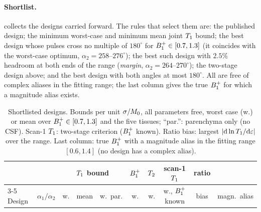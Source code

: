 \paragraph{Shortlist.}  collects the designs carried forward. The rules that
select them are: the published design; the minimum worst-case and minimum mean joint $T_1$
bound; the best design whose pulses cross no multiple of $180^\circ$ for $B_1^{+}\in[0.7,1.3]$ (it coincides
with the worst-case optimum, $\alpha_2=258$--$276^\circ$); the best such design with $2.5\%$ headroom at both ends
of the range (\emph{margin}, $\alpha_2=264$--$270^\circ$); the two-stage design above; and the best design with
both angles at most $180^\circ$. All are free of complex aliases in the fitting range; the last column
gives the true $B_1^{+}$ for which a magnitude alias exists.

\begin{table}[!htbp]
\centering
\caption{Shortlisted designs. Bounds per unit $\sigma/M_0$, all parameters free, worst case (w.) or
mean over $B_1^{+}\in[0.7,1.3]$ and the five tissues; ``par.'': parenchyma only (no CSF). Scan-1 $T_1$:
two-stage criterion ($B_1^{+}$ known). Ratio bias: largest $|\mathrm d\ln T_1/\mathrm d\varepsilon|$ over the range. Last column:
true $B_1^{+}$ with a magnitude alias in the fitting range $[0.6,1.4]$ (no design has a complex alias).}
\label{tab:shortlist}
\footnotesize\setlength{\tabcolsep}{3pt}
\begin{tabular}{lccccccccc}
\toprule
& & \multicolumn{3}{c}{$T_1$ bound} & $B_1^{+}$ & $T_2$ & scan-1 $T_1$ & ratio & \\
\cmidrule(lr){3-5}
Design & $\alpha_1/\alpha_2$ & w. & mean & w.\ par. & w. & w. & w., $B_1^{+}$ known & bias & magn.\ alias\\
\midrule

\bottomrule
\end{tabular}
\end{table}
